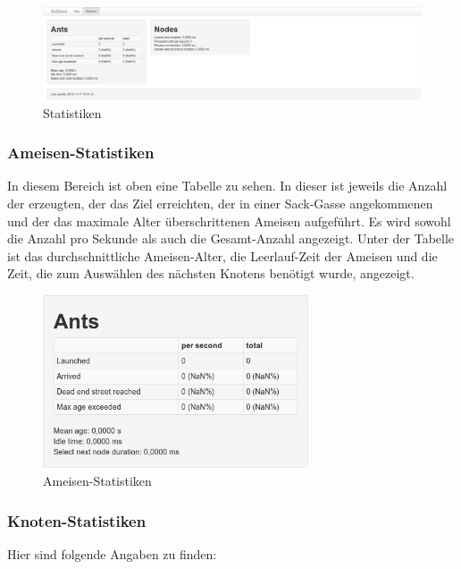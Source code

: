 \documentclass[
  a4paper,
  10pt
]{scrreprt}
\begin{document}
\begin{figure}[htbp]
  \centering
  \includegraphics[width=\textwidth]{Bilder/Statistiken.png}
  \caption{Statistiken}
  \label{fig:statistiken}
\end{figure}

\subsubsection{Ameisen-Statistiken}
\label{sec:ameisen-statistiken}

In diesem Bereich ist oben eine Tabelle zu sehen.
In dieser ist jeweils die Anzahl der erzeugten, der das Ziel erreichten, der in einer Sack-Gasse angekommenen und der das maximale Alter überschrittenen Ameisen aufgeführt.
Es wird sowohl die Anzahl pro Sekunde als auch die Gesamt-Anzahl angezeigt.
Unter der Tabelle ist das durchschnittliche Ameisen-Alter, die Leerlauf-Zeit der Ameisen und die Zeit, die zum Auswählen des nächsten Knotens benötigt wurde, angezeigt.

\begin{figure}[htbp]
  \centering
  \includegraphics[width=0.7\textwidth]{Bilder/Ameisen-Statistiken.png}
  \caption{Ameisen-Statistiken}
  \label{fig:ameisen-statistiken}
\end{figure}

\subsubsection{Knoten-Statistiken}
\label{sec:Knoten-statistiken}

Hier sind folgende Angaben zu finden:
\end{document}
